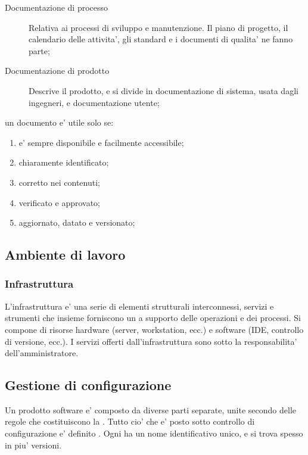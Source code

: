 \begin{description}
	\item[Documentazione di processo] Relativa ai processi di sviluppo e manutenzione. Il piano di progetto, il calendario delle attivita', gli standard e i documenti di qualita' ne fanno parte;
	\item[Documentazione di prodotto] Descrive il prodotto, e si divide in documentazione di sistema, usata dagli ingegneri, e documentazione utente;
\end{description}

un documento e' utile solo se:
\begin{enumerate}
	\item e' sempre disponibile e facilmente accessibile;
	\item chiaramente identificato;
	\item corretto nei contenuti;
	\item verificato e approvato;
	\item aggiornato, datato e versionato;
\end{enumerate}


\subsection{Ambiente di lavoro}

\subsubsection{Infrastruttura}
L'infrastruttura e' una serie di elementi strutturali interconnessi, servizi e strumenti che insieme forniscono un  a supporto delle operazioni e dei processi. Si compone di risorse hardware (server, workstation, ecc.) e software (IDE, controllo di versione, ecc.). I servizi offerti dall'infrastruttura sono sotto la responsabilita' dell'amministratore.

\subsection{Gestione di configurazione}
Un prodotto software e' composto da diverse parti separate, unite secondo delle regole che costituiscono la . Tutto cio' che e' posto sotto controllo di configurazione e' definito . Ogni  ha un nome identificativo unico, e si trova spesso in piu' versioni.

